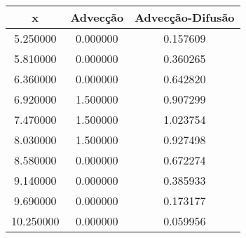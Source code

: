\begin{tabular}{ccc}
\toprule
x & Advecção & Advecção-Difusão \\
\midrule
5.250000 & 0.000000 & 0.157609 \\
5.810000 & 0.000000 & 0.360265 \\
6.360000 & 0.000000 & 0.642820 \\
6.920000 & 1.500000 & 0.907299 \\
7.470000 & 1.500000 & 1.023754 \\
8.030000 & 1.500000 & 0.927498 \\
8.580000 & 0.000000 & 0.672274 \\
9.140000 & 0.000000 & 0.385933 \\
9.690000 & 0.000000 & 0.173177 \\
10.250000 & 0.000000 & 0.059956 \\
\bottomrule
\end{tabular}
